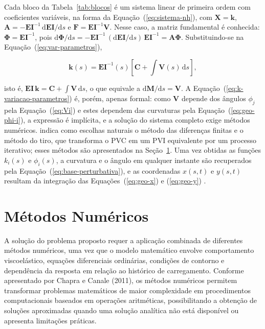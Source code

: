 \documentclass[arial,centeredequations,english,brazilian,oneside,section=TITLE]{ifes8}
\begin{document}
Cada bloco da Tabela~\ref{tab:blocos} é um sistema linear de primeira ordem com
coeficientes variáveis, na forma da Equação~(\ref{eq:sistema-nh}), com
$\mathbf{X} = \mathbf{k}$, $\mathbf{A} = -\mathbf{EI}^{-1}\,\mathrm{d}\mathbf{EI}/
\mathrm{d}s$ e $\mathbf{F} = \mathbf{EI}^{-1}\mathbf{V}$. Nesse caso, a matriz fundamental
é conhecida: $\boldsymbol{\Phi} = \mathbf{EI}^{-1}$, pois $\mathrm{d}\boldsymbol{\Phi}/
\mathrm{d}s = -\mathbf{EI}^{-1}\,(\mathrm{d}\mathbf{EI}/\mathrm{d}s)\,\mathbf{EI}^{-1}
= \mathbf{A}\boldsymbol{\Phi}$. Substituindo-se na Equação~(\ref{eq:var-parametros}),

\begin{equation}
  \label{eq:k-variacao-parametros}
  \mathbf{k}(s) = \mathbf{EI}^{-1}(s)\left[\mathbf{C}
  + \int \mathbf{V}(s)\,\mathrm{d}s\right],
\end{equation}

isto é, $\mathbf{EI}\,\mathbf{k} = \mathbf{C} + \int \mathbf{V}\,\mathrm{d}s$, o que
equivale a $\mathrm{d}\mathbf{M}/\mathrm{d}s = \mathbf{V}$. A
Equação~(\ref{eq:k-variacao-parametros}) é, porém, apenas formal: como $\mathbf{V}$
depende dos ângulos $\phi_j$ pela Equação~(\ref{eq:Vi}) e estes dependem das curvaturas
pela Equação~(\ref{eq:geo-phi-i}), a expressão é implícita, e a solução do sistema
completo exige métodos numéricos.  indica como escolhas
naturais o método das diferenças finitas e o método do tiro, que transforma o PVC em um
PVI equivalente por um processo iterativo; esses métodos são apresentados na
Seção~\ref{sec:metodos-numericos}. Uma vez obtidas as funções $k_i(s)$ e $\phi_i(s)$, a
curvatura e o ângulo em qualquer instante são recuperados pela
Equação~(\ref{eq:base-perturbativa}), e as coordenadas $x(s,t)$ e $y(s,t)$ resultam da
integração das Equações~(\ref{eq:geo-x}) e (\ref{eq:geo-y}) \cite{Caire2011}.


\section{Métodos Numéricos}
\label{sec:metodos-numericos}

A solução do problema proposto requer a aplicação combinada de
diferentes métodos numéricos, uma vez que o modelo matemático envolve
comportamento viscoelástico, equações diferenciais ordinárias,
condições de contorno e dependência da resposta em relação ao histórico
de carregamento. Conforme apresentado por Chapra e Canale (2011), os
métodos numéricos permitem transformar problemas matemáticos de maior
complexidade em procedimentos computacionais baseados em operações
aritméticas, possibilitando a obtenção de soluções aproximadas quando
uma solução analítica não está disponível ou apresenta limitações
práticas.
\end{document}
